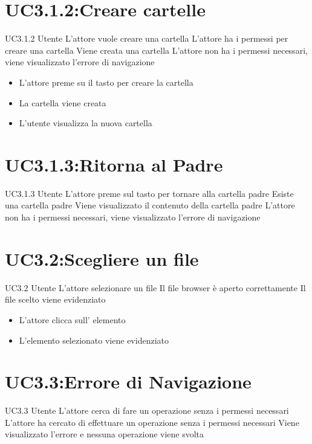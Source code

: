 \documentclass[../AnalisideiRequisiti.tex]{subfiles}
\begin{document}
	\section{UC3.1.2:Creare cartelle}
	\UserCase
	{UC3.1.2}
	{Utente}
	{}
	{L'attore vuole creare una cartella}
	{L'attore ha i permessi per creare una cartella}
	{Viene creata una cartella}
	{L'attore non ha i permessi necessari, viene visualizzato l'errore di navigazione }
	{
		\begin{itemize}
		\item{} L'attore preme su il tasto per creare la cartella
		\item{} La cartella viene creata
		\item{} L'utente visualizza la nuova cartella
		\end{itemize}
	}

	\section{UC3.1.3:Ritorna al Padre}
\UserCase
{UC3.1.3}
{Utente}
{}
{L'attore preme sul tasto per tornare alla cartella padre}
{Esiste una cartella padre}
{Viene visualizzato il contenuto della cartella padre}
{L'attore non ha i permessi necessari, viene visualizzato l'errore di navigazione }
{}
	\section{UC3.2:Scegliere un file}
\UserCase
{UC3.2}
{Utente}
{}
{L'attore selezionare un file}
{Il file browser è aperto correttamente}
{Il file scelto viene evidenziato}
{}
{
	\begin{itemize}
		\item{} L'attore clicca sull' elemento
		\item{} L'elemento selezionato viene evidenziato
	\end{itemize}
}
\section{UC3.3:Errore di Navigazione}
\UserCase
{UC3.3}
{Utente}
{}
{L'attore cerca di fare un operazione senza i permessi necessari}
{L'attore ha cercato di effettuare un operazione senza i permessi necessari}
{Viene visualizzato l'errore e nessuna operazione viene svolta}
{}
{}
\end{document}
